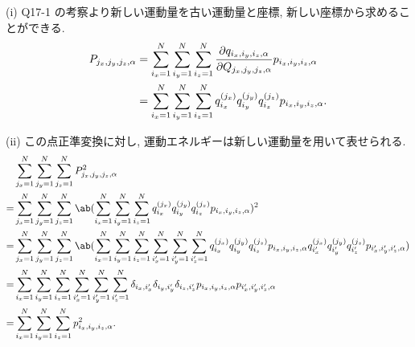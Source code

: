 \documentclass[uplatex,dvipdfmx,a4paper,11pt]{jlreq}
\numberwithin{equation}{section}
\theoremstyle{definition}
\begin{document}
(i) Q17-1 の考察より新しい運動量を古い運動量と座標, 新しい座標から求めることができる.
\begin{align}
  P_{j_x,j_y,j_z,\alpha} & = \sum_{i_x=1}^{N}\sum_{i_y=1}^{N}\sum_{i_z=1}^{N}\diffp{q_{i_x,i_y,i_z,\alpha}}{Q_{j_x,j_y,j_z,\alpha}}p_{i_x,i_y,i_z,\alpha} \\
                         & = \sum_{i_x=1}^{N}\sum_{i_y=1}^{N}\sum_{i_z=1}^{N}q_{i_x}^{(j_x)}q_{i_y}^{(j_y)}q_{i_z}^{(j_z)}p_{i_x,i_y,i_z,\alpha}.
\end{align}

(ii) この点正準変換に対し, 運動エネルギーは新しい運動量を用いて表せられる.
\begin{align}
    & \sum_{j_x=1}^{N}\sum_{j_y=1}^{N}\sum_{j_z=1}^{N}P_{j_x,j_y,j_z,\alpha}^2                                                                                                                                                                                                                             \\
  = & \sum_{j_x=1}^{N}\sum_{j_y=1}^{N}\sum_{j_z=1}^{N}\ab(\sum_{i_x=1}^{N}\sum_{i_y=1}^{N}\sum_{i_z=1}^{N}q_{i_x}^{(j_x)}q_{i_y}^{(j_y)}q_{i_z}^{(j_z)}p_{i_x,i_y,i_z,\alpha})^2                                                                                                                           \\
  = & \sum_{j_x=1}^{N}\sum_{j_y=1}^{N}\sum_{j_z=1}^{N}\ab(\sum_{i_x=1}^{N}\sum_{i_y=1}^{N}\sum_{i_z=1}^{N}\sum_{i_x'=1}^{N}\sum_{i_y'=1}^{N}\sum_{i_z'=1}^{N}q_{i_x}^{(j_x)}q_{i_y}^{(j_y)}q_{i_z}^{(j_z)}p_{i_x,i_y,i_z,\alpha}q_{i_x'}^{(j_x)}q_{i_y'}^{(j_y)}q_{i_z'}^{(j_z)}p_{i_x',i_y',i_z',\alpha}) \\
  = & \sum_{i_x=1}^{N}\sum_{i_y=1}^{N}\sum_{i_z=1}^{N}\sum_{i_x'=1}^{N}\sum_{i_y'=1}^{N}\sum_{i_z'=1}^{N}\delta_{i_x,i_x'}\delta_{i_y,i_y'}\delta_{i_z,i_z'}p_{i_x,i_y,i_z,\alpha}p_{i_x',i_y',i_z',\alpha}                                                                                                \\
  = & \sum_{i_x=1}^{N}\sum_{i_y=1}^{N}\sum_{i_z=1}^{N}p_{i_x,i_y,i_z,\alpha}^2.
\end{align}
\end{document}
